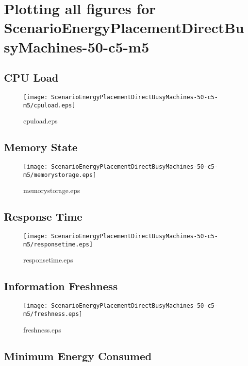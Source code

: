 \documentclass{elsart}
\begin{document}
\section{Plotting all figures for ScenarioEnergyPlacementDirectBusyMachines-50-c5-m5}
\subsection{CPU Load}

\begin{figure}[ht]
\centering
\texttt{[image: ScenarioEnergyPlacementDirectBusyMachines-50-c5-m5/cpuload.eps]}
\caption{cpuload.eps}\label{fig:cpuload}
\end{figure}

\clearpage
\subsection{Memory State}

\begin{figure}[ht]
\centering
\texttt{[image: ScenarioEnergyPlacementDirectBusyMachines-50-c5-m5/memorystorage.eps]}
\caption{memorystorage.eps}\label{fig:memorystorage}
\end{figure}

\clearpage
\subsection{Response Time}

\begin{figure}[ht]
\centering
\texttt{[image: ScenarioEnergyPlacementDirectBusyMachines-50-c5-m5/responsetime.eps]}
\caption{responsetime.eps}\label{fig:responsetime}
\end{figure}

\clearpage
\subsection{Information Freshness}

\begin{figure}[ht]
\centering
\texttt{[image: ScenarioEnergyPlacementDirectBusyMachines-50-c5-m5/freshness.eps]}
\caption{freshness.eps}\label{fig:freshness}
\end{figure}

\clearpage
\subsection{Minimum Energy Consumed}
\end{document}
